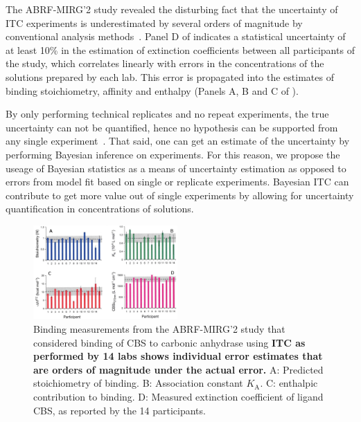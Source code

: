 \documentclass[10pt,final]{article}
\begin{document}
The ABRF-MIRG'2 study revealed the disturbing fact that the uncertainty of ITC experiments is underestimated by several orders of magnitude by conventional analysis methods~\autocite{Myszka2003a}.
%
Panel D of  indicates a statistical uncertainty of at least 10\% in the estimation of extinction coefficients between all participants of the study, which correlates linearly with errors in the concentrations of the solutions prepared by each lab. 
%
This error is propagated into the estimates of binding stoichiometry, affinity and enthalpy  (Panels A, B and C of ).

By only performing technical replicates  and no repeat experiments, the true uncertainty can not be quantified, hence no hypothesis can be supported from any single experiment~\autocite{Vaux2012a}.
%
That said, one can get an estimate of the uncertainty by performing Bayesian inference on experiments.
%
For this reason, we propose the useage of Bayesian statistics as a means of uncertainty estimation as opposed to errors from model fit based on single or replicate experiments.
%
Bayesian ITC can contribute to get more value out of single experiments by allowing for uncertainty quantification in concentrations of solutions. 

\begin{figure}[H]
	\centering
	\includegraphics[width=0.49\textwidth]{figures/cbs_ca_II.PNG}
	\caption{Binding measurements from the ABRF-MIRG'2 study that considered binding of CBS to carbonic anhydrase using \textbf{ITC as performed by 14 labs shows individual error estimates that are orders of magnitude under the actual error.} A: Predicted stoichiometry of binding. B: Association constant $K_\mathrm{A}$. C: enthalpic contribution to binding. D: Measured extinction coefficient of ligand CBS, as reported by the 14 participants.~\autocite{Myszka2003a}}
	\label{figure:abrf-mirg2}
\end{figure}
\end{document}
